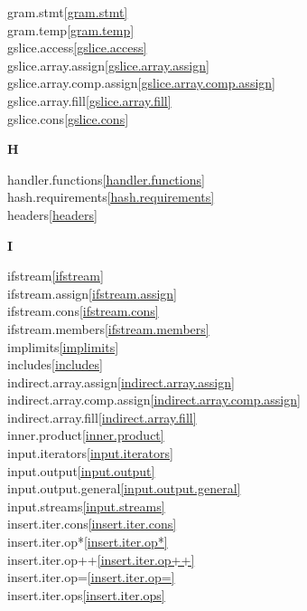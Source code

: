 \begin{multicols}{2}
gram.stmt\quad\ref{gram.stmt}\\
gram.temp\quad\ref{gram.temp}\\
gslice.access\quad\ref{gslice.access}\\
gslice.array.assign\quad\ref{gslice.array.assign}\\
gslice.array.comp.assign\quad\ref{gslice.array.comp.assign}\\
gslice.array.fill\quad\ref{gslice.array.fill}\\
gslice.cons\quad\ref{gslice.cons}\\
\par \textbf{H}\par
handler.functions\quad\ref{handler.functions}\\
hash.requirements\quad\ref{hash.requirements}\\
headers\quad\ref{headers}\\
\par \textbf{I}\par
ifstream\quad\ref{ifstream}\\
ifstream.assign\quad\ref{ifstream.assign}\\
ifstream.cons\quad\ref{ifstream.cons}\\
ifstream.members\quad\ref{ifstream.members}\\
implimits\quad\ref{implimits}\\
includes\quad\ref{includes}\\
indirect.array.assign\quad\ref{indirect.array.assign}\\
indirect.array.comp.assign\quad\ref{indirect.array.comp.assign}\\
indirect.array.fill\quad\ref{indirect.array.fill}\\
inner.product\quad\ref{inner.product}\\
input.iterators\quad\ref{input.iterators}\\
input.output\quad\ref{input.output}\\
input.output.general\quad\ref{input.output.general}\\
input.streams\quad\ref{input.streams}\\
insert.iter.cons\quad\ref{insert.iter.cons}\\
insert.iter.op*\quad\ref{insert.iter.op*}\\
insert.iter.op++\quad\ref{insert.iter.op++}\\
insert.iter.op=\quad\ref{insert.iter.op=}\\
insert.iter.ops\quad\ref{insert.iter.ops}\\

\end{multicols}
